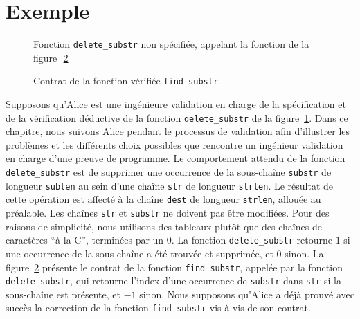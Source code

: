 \section{Exemple}
\label{sec:ncd-ex}


\begin{figure}[t]
  
  \vspace{-3mm}
  \caption{Fonction \lstinline{delete_substr} non spécifiée, appelant la
    fonction de la figure~\,\ref{fig:findSubstr}}
  \vspace{-3mm}
  \label{fig:deleteSubstrTrous}
\end{figure}

\begin{figure}[t]
  
  \vspace{-3mm}
  \caption{Contrat \eacsl de la fonction vérifiée \lstinline{find_substr}}
  \vspace{-3mm}
  \label{fig:findSubstr}
\end{figure}

Supposons qu'Alice est une ingénieure validation en charge de la spécification
et de la vérification déductive de la fonction \lstinline{delete_substr} de la
figure~\ref{fig:deleteSubstrTrous}.
Dans ce chapitre, nous suivons Alice pendant le processus de validation afin
d'illustrer les problèmes et les différents choix possibles que rencontre un
ingénieur validation en charge d'une preuve de programme.
Le comportement attendu de la fonction \lstinline{delete_substr} est de
supprimer une occurrence de la sous-chaîne \lstinline{substr} de longueur
\lstinline{sublen} au sein d'une chaîne \lstinline{str} de longueur
\lstinline{strlen}.
Le résultat de cette opération est affecté à la chaîne \lstinline{dest} de
longueur \lstinline'strlen', allouée au préalable.
Les chaînes \lstinline{str} et \lstinline{substr} ne doivent pas être modifiées.
Pour des raisons de simplicité, nous utilisons des tableaux plutôt que des
chaînes de caractères ``à la C'', terminées par un 0.
La fonction \lstinline{delete_substr} retourne $1$ si une occurrence de la
sous-chaîne a été trouvée et supprimée, et $0$ sinon.
La figure~\ref{fig:findSubstr} présente le contrat de la fonction
\lstinline{find_substr}, appelée par la fonction \lstinline{delete_substr}, qui
retourne l'index d'une occurrence de \lstinline{substr} dans \lstinline{str} si
la sous-chaîne est présente, et $-1$ sinon.
Nous supposons qu'Alice a déjà prouvé avec succès la correction de la fonction
\lstinline{find_substr} vis-à-vis de son contrat.

